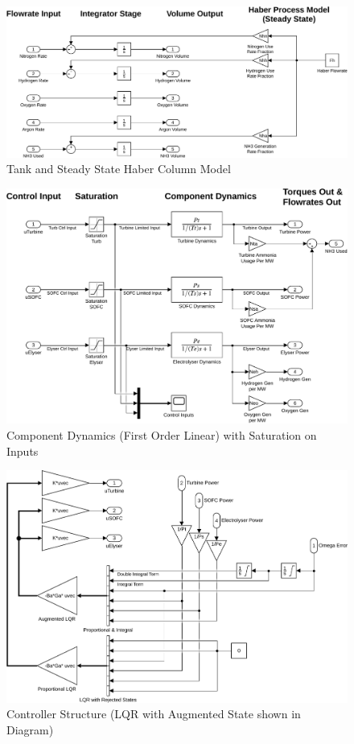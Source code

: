 \begin{figure}[p]
\centering
        \includegraphics[scale=0.65]{images/plant2/tank.pdf}
    \caption{Tank and Steady State Haber Column Model}
        \label{fig:tank}
\end{figure}
\begin{figure}[p]
\centering
        \includegraphics[scale=0.7]{images/plant2/comp.pdf}
    \caption{Component Dynamics (First Order Linear) with Saturation on Inputs}
        \label{fig:comp}
\end{figure}
\begin{figure}[p]
\centering
        \includegraphics[scale=0.7]{images/plant2/ctrl.pdf}
    \caption{Controller Structure (LQR with Augmented State shown in Diagram)}
        \label{fig:ctrl}
\end{figure}
